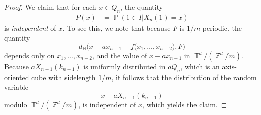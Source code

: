 \documentclass[dvipsnames,letterpaper,12pt]{article}
\numberwithin{equation}{section}
\DeclareMathOperator{\ZZ}{\mathbb{Z}}
\DeclareMathOperator{\TT}{\mathbb{T}}
\numberwithin{theorem}{section}
\DeclareMathOperator{\PP}{\mathbb{P}}
\begin{document}
\begin{proof}
    We claim that for each $x \in Q_n$, the quantity
    \begin{align*}
        P(x) &= \PP ( 1 \in I | X_n(1) = x)%
    \end{align*}
    is \emph{independent} of $x$. To see this, we note that because $F$ is $1/m$ periodic, the quantity
    \[ d_{\mathbb{H}} \Big( x - a x_{n-1} - f \big( x_1,\dots,x_{n-2} \big), F \Big) \]
    depends only on $x_1,\dots,x_{n-2}$, and the value of $x - a x_{n-1}$ in $\TT^d / (\ZZ^d / m)$.  Because $a X_{n-1}(k_{n-1})$ is uniformly distributed in $a Q_n$, which is an axis-oriented cube with sidelength $1/m$, it follows that the distribution of the random variable
    \[ x - a X_{n-1}(k_{n-1}) \]
    modulo $\TT^d / (\ZZ^d / m)$, is independent of $x$, which yields the claim.


\end{proof}
\end{document}
